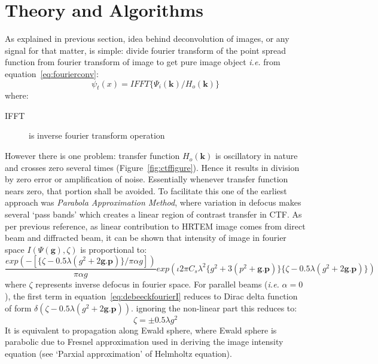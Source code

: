 \section{Theory and Algorithms}
As explained in previous section, idea behind deconvolution of images, or any signal for that matter, is simple: divide fourier transform of the point spread function from fourier transform of image to get pure image object \textit{i.e.} from equation~\ref{eq:fourierconv}:
\begin{equation}
    \psi_t(x)= IFFT\{\Psi_i(\boldsymbol{k}) / H_o(\boldsymbol{k})\}
\end{equation}
where:
\begin{description}
    \item[IFFT] is inverse fourier transform operation
\end{description}
However there is one problem: transfer function $H_o(\boldsymbol{k})$ is oscillatory in nature and crosses zero several times (Figure~\ref{fig:ctffigure}).
Hence it results in division by zero error or amplification of noise.
Essentially whenever transfer function nears zero, that portion shall be avoided. 
To facilitate this one of the earliest approach was \textit{Parabola Approximation Method}\cite{OpdeBeeck1996}, where variation in defocus makes several `pass bands' which creates a linear region of contrast transfer in CTF.
As per previous reference, as linear contribution to HRTEM image comes from direct beam and diffracted beam, it can be shown that intensity of image in fourier space $I(\Psi(\boldsymbol{g}),\zeta)$ is proportional to:
\begin{equation}
    \frac{exp(-[\{\zeta - 0.5\lambda(g^2 + 2\boldsymbol{g.p})\}/\pi\alpha g])}{\pi\alpha g}exp(\iota 2 \pi C_s \lambda ^2\{g^2 + 3(p^2 + \boldsymbol{g.p})\}\{\zeta - 0.5 \lambda (g^2 + 2\boldsymbol{g.p})\})
    \label{eq:debeeckfourierI}
\end{equation}
where $\zeta$ represents inverse defocus in fourier space.
For parallel beams (\textit{i.e.} $\alpha = 0$), the first term in equation~\ref{eq:debeeckfourierI} reduces to Dirac delta function of form $\delta (\zeta - 0.5\lambda (g^2 + 2\boldsymbol{g.p}))$. 
ignoring the non-linear part this reduces to:
\begin{equation}
    \zeta = \pm 0.5\lambda g^2
\end{equation}
It is equivalent to propagation along Ewald sphere, where Ewald sphere is parabolic due to Fresnel approximation used in deriving the image intensity equation (see `Parxial approximation' of Helmholtz equation\cite{Hecht2002}). 
